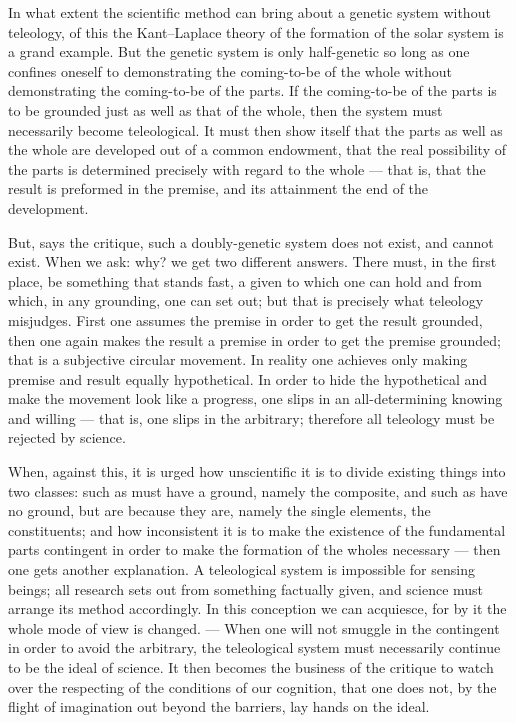 \documentclass[12pt]{book}
\begin{document}
In what extent the scientific method can bring about a genetic system without
teleology, of this the Kant--Laplace theory of the formation of the solar
system is a grand example. But the genetic system is only half-genetic so long
as one confines oneself to demonstrating the coming-to-be of the whole without
demonstrating the coming-to-be of the parts. If the coming-to-be of the parts is
to be grounded just as well as that of the whole, then the system must
necessarily become teleological. It must then show itself that the parts as
well as the whole are developed out of a common endowment, that the real
possibility of the parts is determined precisely with regard to the whole ---
that is, that the result is preformed in the premise, and its attainment the
end of the development.

But, says the critique, such a doubly-genetic system does not exist, and cannot
exist. When we ask: why? we get two different answers. There must, in the first
place, be something that stands fast, a given to which one can hold and from
which, in any grounding, one can set out; but that is precisely what teleology
misjudges. First one assumes the premise in order to get the result grounded,
then one again makes the result a premise in order to get the premise grounded;
that is a subjective circular movement. In reality one achieves only making
premise and result equally hypothetical. In order to hide the hypothetical and
make the movement look like a progress, one slips in an all-determining knowing
and willing --- that is, one slips in the arbitrary; therefore all teleology
must be rejected by science.

When, against this, it is urged how unscientific it is to divide existing things
into two classes: such as must have a ground, namely the composite, and such as
have no ground, but are because they are, namely the single elements, the
constituents; and how inconsistent it is to make the existence of the
fundamental parts contingent in order to make the formation of the wholes
necessary --- then one gets another explanation. A teleological system is
impossible for sensing beings; all research sets out from something factually
given, and science must arrange its method accordingly. In this conception we
can acquiesce, for by it the whole mode of view is changed. --- When one will
not smuggle in the contingent in order to avoid the arbitrary, the teleological
system must necessarily continue to be the ideal of science. It then becomes the
business of the critique to watch over the respecting of the conditions of our
cognition, that one does not, by the flight of imagination out beyond the
barriers, lay hands on the ideal.
\end{document}
